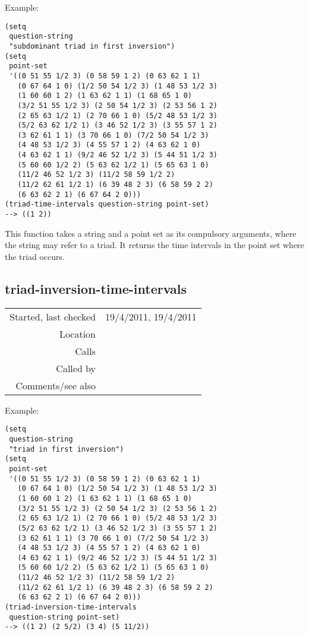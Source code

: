 \vspace{0.5cm}
\noindent Example:
\begin{verbatim}
(setq
 question-string
 "subdominant triad in first inversion")
(setq
 point-set
 '((0 51 55 1/2 3) (0 58 59 1 2) (0 63 62 1 1)
   (0 67 64 1 0) (1/2 50 54 1/2 3) (1 48 53 1/2 3)
   (1 60 60 1 2) (1 63 62 1 1) (1 68 65 1 0)
   (3/2 51 55 1/2 3) (2 50 54 1/2 3) (2 53 56 1 2)
   (2 65 63 1/2 1) (2 70 66 1 0) (5/2 48 53 1/2 3)
   (5/2 63 62 1/2 1) (3 46 52 1/2 3) (3 55 57 1 2)
   (3 62 61 1 1) (3 70 66 1 0) (7/2 50 54 1/2 3)
   (4 48 53 1/2 3) (4 55 57 1 2) (4 63 62 1 0)
   (4 63 62 1 1) (9/2 46 52 1/2 3) (5 44 51 1/2 3)
   (5 60 60 1/2 2) (5 63 62 1/2 1) (5 65 63 1 0)
   (11/2 46 52 1/2 3) (11/2 58 59 1/2 2)
   (11/2 62 61 1/2 1) (6 39 48 2 3) (6 58 59 2 2)
   (6 63 62 2 1) (6 67 64 2 0)))
(triad-time-intervals question-string point-set)
--> ((1 2))
\end{verbatim}

\noindent This function takes a string and a point
set as its compulsory arguments, where the string
may refer to a triad. It returns the time intervals in
the point set where the triad occurs.


\subsection*{triad-inversion-time-intervals}\label{fun:triad-inversion-time-intervals}

\vspace{0.3cm}
\begin{tabular}{r|p{8cm}}
Started, last checked & 19/4/2011, 19/4/2011 \\
Location & \nameref{sec:chord-labelling} \\
Calls & \nameref{fun:HarmAn->roman} \\
Called by & \nameref{fun:c@merata2014-question2answer} \\
Comments/see also & 
\end{tabular}

\vspace{0.5cm}
\noindent Example:
\begin{verbatim}
(setq
 question-string
 "triad in first inversion")
(setq
 point-set
 '((0 51 55 1/2 3) (0 58 59 1 2) (0 63 62 1 1)
   (0 67 64 1 0) (1/2 50 54 1/2 3) (1 48 53 1/2 3)
   (1 60 60 1 2) (1 63 62 1 1) (1 68 65 1 0)
   (3/2 51 55 1/2 3) (2 50 54 1/2 3) (2 53 56 1 2)
   (2 65 63 1/2 1) (2 70 66 1 0) (5/2 48 53 1/2 3)
   (5/2 63 62 1/2 1) (3 46 52 1/2 3) (3 55 57 1 2)
   (3 62 61 1 1) (3 70 66 1 0) (7/2 50 54 1/2 3)
   (4 48 53 1/2 3) (4 55 57 1 2) (4 63 62 1 0)
   (4 63 62 1 1) (9/2 46 52 1/2 3) (5 44 51 1/2 3)
   (5 60 60 1/2 2) (5 63 62 1/2 1) (5 65 63 1 0)
   (11/2 46 52 1/2 3) (11/2 58 59 1/2 2)
   (11/2 62 61 1/2 1) (6 39 48 2 3) (6 58 59 2 2)
   (6 63 62 2 1) (6 67 64 2 0)))
(triad-inversion-time-intervals
 question-string point-set)
--> ((1 2) (2 5/2) (3 4) (5 11/2))
\end{verbatim}

